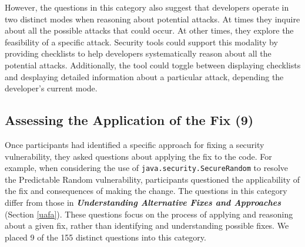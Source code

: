 \documentclass[conference]{IEEEtran}
\begin{document}
However, the questions in this category also suggest that developers operate in two distinct modes when reasoning about potential attacks.
At times they inquire about all the possible attacks that could occur.
At other times, they explore the feasibility of a specific attack.
Security tools could support this modality by providing checklists to help developers systematically reason about all the potential attacks. 
Additionally, the tool could toggle between displaying checklists and desplaying detailed information about a particular attack, depending the developer's current mode.



\noindent\subsection{\textbf{Assessing the Application of the Fix (9)}}\label{aaf}
Once participants had identified a specific approach for fixing a security vulnerability, they asked questions about applying the fix to the code.
For example, when considering the use of \texttt{java.security.SecureRandom} to resolve the Predictable Random vulnerability, participants questioned the applicability of the fix and consequences of making the change. 
The questions in this category differ from those in \emph{\textbf{Understanding Alternative Fixes and Approaches}} (Section \ref{uafa}). 
These questions focus on the process of applying  and reasoning about a given fix, rather than identifying and understanding possible fixes.
We placed 9 of the 155 distinct questions into this category.
\\
\end{document}
